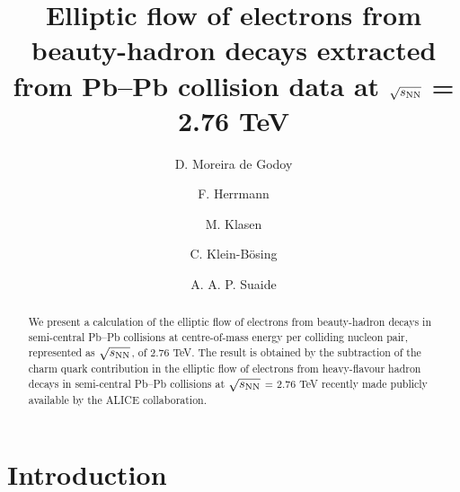 \documentclass[11pt,a4paper]{article}
\providecommand{\snn}{$\sqrt{s_{\rm NN}}$ }
\begin{document}
%
\title{Elliptic flow of electrons from beauty-hadron decays extracted from Pb--Pb collision data at \snn = 2.76 TeV}

\author[1]{D. Moreira de Godoy}
\author[1]{F. Herrmann}
\author[1]{M. Klasen}
\author[1,2]{C. Klein-B\"osing}
\author[3]{A. A. P. Suaide}





\date{}

\maketitle


\begin{abstract}
We present a calculation of the elliptic flow of electrons from beauty-hadron decays in semi-central Pb--Pb collisions at centre-of-mass energy per colliding nucleon pair, represented as  $\sqrt{s_{\rm NN}}$,  of 2.76 TeV. The result is obtained by the subtraction of the charm quark contribution in the  elliptic flow of electrons from heavy-flavour hadron decays in  semi-central Pb--Pb collisions at \snn = 2.76 TeV recently made publicly available by the ALICE collaboration.
\end{abstract}



\section{Introduction}
\label{Sec:Introduction}
 
\end{document}
